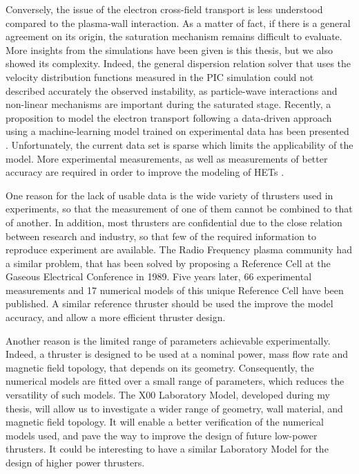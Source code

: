     Conversely, the issue of the electron cross-field transport is less understood compared to the plasma-wall interaction.
    As a matter of fact, if there is a general agreement on its origin, the saturation mechanism remains difficult to evaluate.
    More insights from the simulations have been given is this thesis, but we also showed its complexity.
    Indeed, the general dispersion relation solver that uses the velocity distribution functions measured in the PIC simulation could not described accurately the observed instability, as particle-wave interactions and non-linear mechanisms are important during the saturated stage.
    Recently, a proposition to model the electron transport following a data-driven approach using a machine-learning model trained on experimental data has been presented \citep{jorns2018}.
    Unfortunately, the current data set is sparse which limits the applicability of the model.
    More experimental measurements, as well as measurements of better accuracy are required in order to improve the modeling of HETs \citep{mikellides2019}.

    One reason for the lack of usable data is the wide variety of thrusters used in experiments, so that the measurement of one of them cannot be combined to that of another.
    In addition, most thrusters are confidential due to the close relation between research and industry, so that few of the required information to reproduce experiment are available.
    The Radio Frequency plasma community had a similar problem, that has been solved by proposing a Reference Cell at the Gaseous Electrical Conference in 1989\citep{olthoff1995}.
    Five years later, 66 experimental measurements and 17 numerical models of this unique Reference Cell have been published.
    A similar reference thruster should be used the improve the model accuracy, and allow a more efficient thruster design.

    Another reason is the limited range of parameters achievable experimentally.
    Indeed, a thruster is designed to be used at a nominal power, mass flow rate and magnetic field topology, that depends on its geometry.
    Consequently, the numerical models are fitted over a small range of parameters, which reduces the versatility of such models.
    The \PPS X00 Laboratory Model, developed during my thesis, will allow us to investigate a wider range of geometry, wall material, and magnetic field topology.
    It will enable a better verification of the numerical models used, and pave the way to improve the design of future low-power thrusters.
    It could be interesting to have a similar Laboratory Model for the design of higher power thrusters. 



